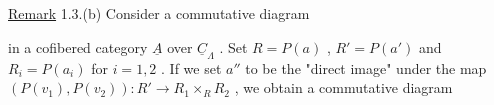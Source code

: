\underline{Remark} 1.3.(b)    Consider a commutative diagram

\begin{center}
\end{center}
in a cofibered category  $\underline{A}$  over  $\underline{C}_{\Lambda}$ . Set  $R = P(a)$ , $R' = P(a')$  and
$R_{i} = P(a_{i})$  for  $i = 1, 2$ . If we set  $a''$  to be the  "direct image"  under the
map  $(P(v_{1}),P(v_{2})) : R' \to R_{1} \times_{R} R_{2}$ , we obtain a commutative diagram

